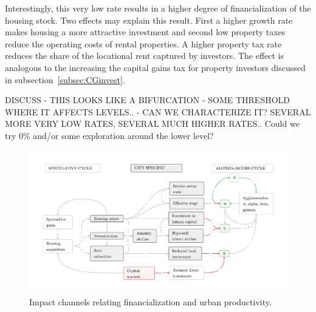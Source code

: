 Interestingly, this very low rate results in a higher degree of financialization of the housing stock. Two effects may explain this result. First a higher growth rate makes housing a more attractive investment and second low property taxes reduce the operating costs of rental properties. A higher property tax rate reduces the share of the locational rent captured by investors. The effect is analogous to the increasing the capital gains tax for property investors discussed in subsection~\ref{subsec:CGinvest}.


{\color{red} DISCUSS - THIS LOOKS LIKE A BIFURCATION - SOME THRESHOLD WHERE IT AFFECTS LEVELS.. - CAN WE CHARACTERIZE IT? SEVERAL MORE VERY LOW RATES, SEVERAL MUCH HIGHER RATES..
Could we try 0\% and/or some exploration around the lower level?
}



\begin{figure}[h!tb]\label{fig-impact-channels2}
\begin{adjustwidth}{-0.24\textwidth}{-0.24\textwidth}
\centering
\includegraphics[scale=.15 ]{fig/impact-channels.png}%
\end{adjustwidth}
\caption[Impact channels relating financialization and urban productivity]{Impact channels relating financialization and urban productivity.}
\end{figure}


